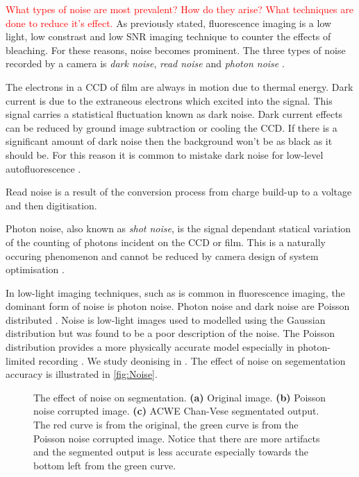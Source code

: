 \begin{definition}[Noise]
\textcolor{red}{What types of noise are most prevalent? How do they arise? What techniques are done to reduce it's effect.}
As previously stated, fluorescence imaging is a low light, low constrast and low SNR imaging technique to counter the effects of bleaching.
For these reasons, noise becomes prominent. The three types of noise recorded by a camera is \textit{dark noise}, \textit{read noise} and \textit{photon noise} \citep{Dobrucki2013,Danek2012,Matula2012,Hubeny2008}.

The electrons in a CCD of film are always in motion due to thermal energy.
Dark current is due to the extraneous electrons which excited into the signal.
This signal carries a statistical fluctuation known as dark noise.
Dark current effects can be reduced by ground image subtraction or cooling the CCD.
If there is a significant amount of dark noise then the background won't be as black as it should be.
For this reason it is common to mistake dark noise for low-level autofluorescence \citep{Ryan2016,Dobrucki2013}.

Read noise is a result of the conversion process from charge build-up to a voltage and then digitisation.

Photon noise, also known as \textit{shot noise}, is the signal dependant statical variation of the counting of photons incident on the CCD or film.
This is a naturally occuring phenomenon and cannot be reduced by camera design of system optimisation \cite{Ryan2016}.

In low-light imaging techniques, such as is common in fluorescence imaging, the dominant form of noise is photon noise.
Photon noise and dark noise are Poisson distributed \citep{Danek2012,Ryan2016,Kempen1999}.
Noise is low-light images used to modelled using the Gaussian distribution but was found to be a poor description of the noise.
The Poisson distribution provides a more physically accurate model especially in photon-limited recording \citep{Sarder2006}.
We study deonising in .
The effect of noise on segementation accuracy is illustrated in \autoref{fig:Noise}.

\begin{figure}[!t]
	\centering
	\caption{The effect of noise on segmentation. 
		\textbf{(a)} Original image. 
		\textbf{(b)} Poisson noise corrupted image.
		\textbf{(c)} ACWE Chan-Vese segmentated output. The red curve is from the original, the green curve is from the Poisson noise corrupted image. Notice that there are more artifacts and the segmented output is less accurate especially towards the bottom left from the green curve.}
	\label{fig:Noise}
\end{figure}
\end{definition}


